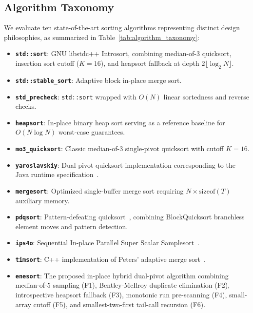 \documentclass[journal]{IEEEtran}
\begin{document}
\subsection{Algorithm Taxonomy}
We evaluate ten state-of-the-art sorting algorithms representing distinct design philosophies, as summarized in Table~\ref{tab:algorithm_taxonomy}:
\begin{itemize}
    \item \textbf{\texttt{std::sort}}: GNU libstdc++ Introsort, combining median-of-3 quicksort, insertion sort cutoff ($K=16$), and heapsort fallback at depth $2 \lfloor \log_2 N \rfloor$.
    \item \textbf{\texttt{std::stable\_sort}}: Adaptive block in-place merge sort.
    \item \textbf{\texttt{std\_precheck}}: \texttt{std::sort} wrapped with $O(N)$ linear sortedness and reverse checks.
    \item \textbf{\texttt{heapsort}}: In-place binary heap sort serving as a reference baseline for $O(N \log N)$ worst-case guarantees.
    \item \textbf{\texttt{mo3\_quicksort}}: Classic median-of-3 single-pivot quicksort with cutoff $K=16$.
    \item \textbf{\texttt{yaroslavskiy}}: Dual-pivot quicksort implementation corresponding to the Java runtime specification~\cite{yaroslavskiy2009dual}.
    \item \textbf{\texttt{mergesort}}: Optimized single-buffer merge sort requiring $N \times \text{sizeof}(T)$ auxiliary memory.
    \item \textbf{\texttt{pdqsort}}: Pattern-defeating quicksort~\cite{peters2015pdqsort}, combining BlockQuicksort branchless element moves and pattern detection.
    \item \textbf{\texttt{ips4o}}: Sequential In-place Parallel Super Scalar Samplesort~\cite{axtmann2017ips4o}.
    \item \textbf{\texttt{timsort}}: C++ implementation of Peters' adaptive merge sort~\cite{peters2002timsort}.
    \item \textbf{\texttt{enesort}}: The proposed in-place hybrid dual-pivot algorithm combining median-of-5 sampling (F1), Bentley-McIlroy duplicate elimination (F2), introspective heapsort fallback (F3), monotonic run pre-scanning (F4), small-array cutoff (F5), and smallest-two-first tail-call recursion (F6).
\end{itemize}
\end{document}
